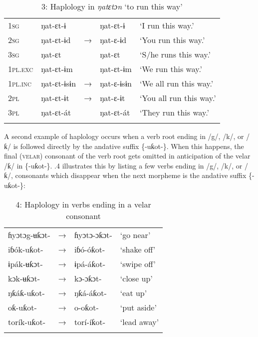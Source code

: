 \begin{table}
\caption{3: Haplology in \textit{ŋatɛtɔn }‘to run this way’}
\label{tab:2}


\begin{tabularx}{\textwidth}{XXXXX}
\lsptoprule

\textsc{1sg} & ŋat-ɛt-ɨ &  & ŋat-ɛt-ɨ & ‘I run this way.’\\
\textsc{2sg} & ŋat-ɛt-ɨd & → & ŋat-ɛ{}-ɨd & ‘You run this way.’\\
\textsc{3sg} & ŋat-ɛt &  & ŋat-ɛt & ‘S/he runs this way.’\\
\textsc{1pl.exc} & ŋat-ɛt-ɨm &  & ŋat-ɛt-ɨm & ‘We run this way.’\\
\textsc{1pl.inc} & ŋat-ɛt-ɨsɨn & → & ŋat-ɛ{}-ɨsɨn & ‘We all run this way.’\\
\textsc{2pl} & ŋat-ɛt-ɨt & → & ŋat-ɛ{}-ɨt & ‘You all run this way.’\\
\textsc{3pl} & ŋat-ɛt-át &  & ŋat-ɛt-át & ‘They run this way.’\\
\lspbottomrule
\end{tabularx}
\end{table}

A second example of haplology occurs when a verb root ending in /g/, /k/, or /ƙ/ is followed directly by the andative\textsc{ }suffix \{-uƙot-\}. When this happens, the final (\textsc{velar}) consonant of the verb root gets omitted in anticipation of the velar /ƙ/ in \{-uƙot-\}. .4 illustrates this by listing a few verbs ending in /g/, /k/, or /ƙ/, consonants which disappear when the next morpheme is the andative\textsc{ }suffix \{-uƙot-\}:


\begin{table}
\caption{4: Haplology in verbs ending in a velar consonant}
\label{tab:2}


\begin{tabularx}{\textwidth}{XXXX}
\lsptoprule

ɦyɔtɔg-ʉƙɔt- & → & ɦyɔtɔ-ɔƙɔt- & ‘go near’\\
iɓók-uƙot- & → & iɓó-óƙot- & ‘shake off’\\
ɨpák-ʉƙɔt- & → & ɨpá-áƙot- & ‘swipe off’\\
kɔk-ʉƙɔt- & → & kɔ-ɔƙɔt- & ‘close up’\\
ŋƙáƙ-uƙot- & → & ŋƙá-áƙot- & ‘eat up’\\
oƙ-uƙot- & → & o-oƙot- & ‘put aside’\\
torík-uƙot- & → & torí-íƙot- & ‘lead away’\\
\lspbottomrule
\end{tabularx}
\end{table}

